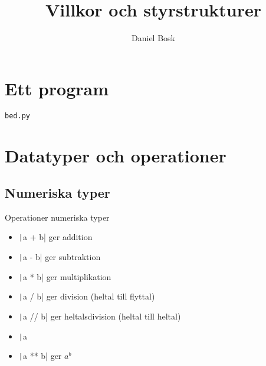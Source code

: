 \title{%
  Villkor och styrstrukturer
}
\author{Daniel Bosk}


\mode*

\begin{abstract}
  
\end{abstract}


\section{Ett program}

\begin{frame}[fragile]
  \Large\texttt{bed.py}
\end{frame}


\section{Datatyper och operationer}

\subsection{Numeriska typer}

\begin{frame}[fragile]
  \begin{block}{Operationer numeriska typer}
    \begin{itemize}
      \item \texttt|a + b| ger addition
      \item \texttt|a - b| ger subtraktion
      \item \texttt|a * b| ger multiplikation
      \item \texttt|a / b| ger division (heltal till flyttal)
      \item \texttt|a // b| ger heltalsdivision (heltal till heltal)
      \item \texttt|a %
      \item \texttt|a ** b| ger \(a^b\)
    \end{itemize}
  \end{block}
\end{frame}

